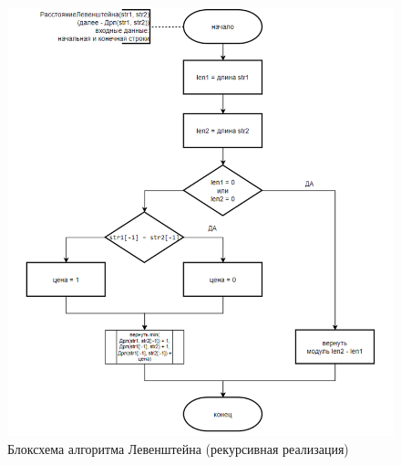 \begin{figure}[H]
    \centering
    \includegraphics[width=1.1\textwidth]{img/block_1_2.png}
    \caption{Блоксхема алгоритма Левенштейна (рекурсивная реализация)}
\end{figure}

